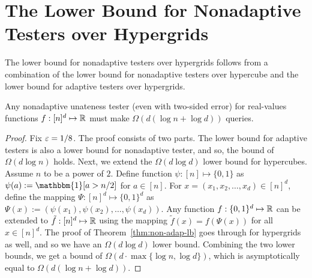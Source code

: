 \section{The Lower Bound for Nonadaptive Testers over Hypergrids}\label{sec:na-lb-hg}
The lower bound for nonadaptive testers over hypergrids follows from a combination of the lower bound for nonadaptive testers over hypercube and the lower bound for adaptive testers over hypergrids.

\begin{theorem}
Any nonadaptive unateness tester (even with two-sided error) for real-values functions $f:[n]^d \mapsto {\mathbb R}$ must make $\Omega(d(\log n + \log d))$ queries.
\end{theorem}
\begin{proof}
Fix $\varepsilon = 1/8$. The proof consists of two parts. The lower bound for adaptive testers is also a lower bound for nonadaptive tester, and so, the bound of $\Omega(d \log n)$ holds.
Next, we extend the $\Omega(d \log d)$ lower bound for hypercubes.
Assume $n$ to be a power of $2$. Define function $\psi:[n] \mapsto \{0,1\}$ as $\psi(a):= \mathbbm{1}[a > n/2]$ for $a \in [n]$. For $x = (x_1, x_2, \ldots, x_d) \in [n]^d$, define the mapping $\Psi: [n]^d \mapsto \{0,1\}^d$ as $\Psi(x) := (\psi(x_1), \psi(x_2), \ldots, \psi(x_d))$. Any function $f:\{0,1\}^d \mapsto {\mathbb R}$ can be extended to $\tilde{f}:[n]^d \mapsto {\mathbb R}$ using the mapping $\tilde{f}(x) = f(\Psi(x))$ for all $x \in [n]^d$. The proof of Theorem~\ref{thm:non-adap-lb} goes through for hypergrids as well, and so we have an $\Omega(d \log d)$ lower bound. Combining the two lower bounds, we get a bound of $\Omega(d \cdot \max\{\log n, \log d\})$, which is asymptotically equal to $\Omega(d(\log n + \log d))$.
\end{proof}

